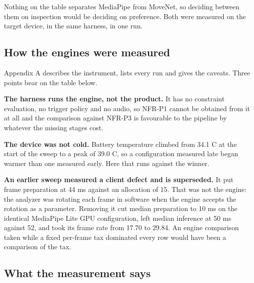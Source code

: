 Nothing on the table separates MediaPipe from MoveNet, so deciding between them on inspection would be deciding on preference. Both were measured on the target device, in the same harness, in one run.

\subsection{How the engines were measured}
\label{sec:4.2.2}

Appendix A describes the instrument, lists every run and gives the caveats. Three points bear on the table below.

\textbf{The harness runs the engine, not the product.} It has no constraint evaluation, no trigger policy and no audio, so NFR-P1 cannot be obtained from it at all and the comparison against NFR-P3 is favourable to the pipeline by whatever the missing stages cost.

\textbf{The device was not cold.} Battery temperature climbed from 34.1 C at the start of the sweep to a peak of 39.0 C, so a configuration measured late began warmer than one measured early. Here that runs against the winner.

\textbf{An earlier sweep measured a client defect and is superseded.} It put frame preparation at 44 ms against an allocation of 15. That was not the engine: the analyzer was rotating each frame in software when the engine accepts the rotation as a parameter. Removing it cut median preparation to 10 ms on the identical MediaPipe Lite GPU configuration, left median inference at 50 ms against 52, and took its frame rate from 17.70 to 29.84. An engine comparison taken while a fixed per-frame tax dominated every row would have been a comparison of the tax.

\subsection{What the measurement says}
\label{sec:4.2.3}

